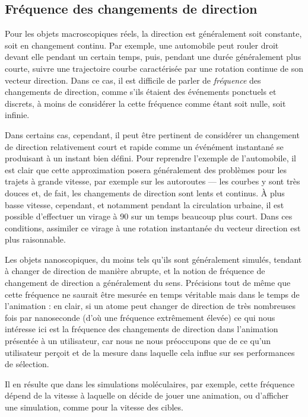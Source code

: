     \subsection{Fréquence des changements de direction}
    Pour les objets macroscopiques réels, la direction est généralement soit constante, soit en changement continu. Par exemple, une automobile peut rouler droit devant elle pendant un certain temps, puis, pendant une durée généralement plus courte, suivre une trajectoire courbe caractérisée par une rotation continue de son vecteur direction. Dans ce cas, il est difficile de parler de \emph{fréquence} des changements de direction, comme s'ils étaient des événements ponctuels et discrets, à moins de considérer la cette fréquence comme étant soit nulle, soit infinie.
    
    Dans certains cas, cependant, il peut être pertinent de considérer un changement de direction relativement court et rapide comme un événément instantané se produisant à un instant bien défini. Pour reprendre l'exemple de l'automobile, il est clair que cette approximation posera généralement des problèmes pour les trajets à grande vitesse, par exemple sur les autoroutes --- les courbes y sont très douces et, de fait, les changements de direction sont lents et continus. À plus basse vitesse, cependant, et notamment pendant la circulation urbaine, il est possible d'effectuer un virage à 90\textdegree{} sur un temps beaucoup plus court. Dans ces conditions, assimiler ce virage à une rotation instantanée du vecteur direction est plus raisonnable.
    
    Les objets nanoscopiques, du moins tels qu'ils sont généralement simulés, tendant à changer de direction de manière abrupte, et la notion de fréquence de changement de direction a généralement du sens. Précisions tout de même que cette fréquence ne saurait être mesurée en temps véritable mais dans le temps de l'animation : en clair, si un atome peut changer de direction de très nombreuses fois par nanoseconde (d'où une fréquence extrêmement élevée) ce qui nous intéresse ici est la fréquence des changements de direction dans l'animation présentée à un utilisateur, car nous ne nous préoccupons que de ce qu'un utilisateur perçoit et de la mesure dans laquelle cela influe sur ses performances de sélection.
    
    Il en résulte que dans les simulations moléculaires, par exemple, cette fréquence dépend de la vitesse à laquelle on décide de jouer une animation, ou d'afficher une simulation, comme pour la vitesse des cibles.
    
